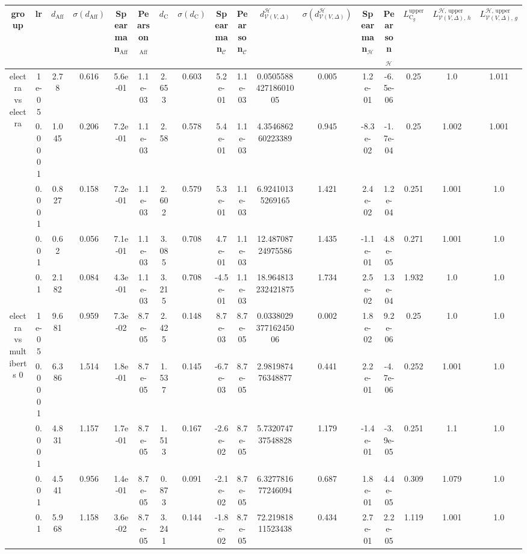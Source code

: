 \begin{tabular}{|c|c|c|c|c|c|c|c|c|c|c|c|c|c|c|c|c|}
\hline
group & lr & $d_{\mathrm{Aff}}$ & $\sigma(d_{\mathrm{Aff}})$ & Spearman$_{\mathrm{Aff}}$ & Pearson$_{\mathrm{Aff}}$ & $d_{\mathrm{C}}$ & $\sigma(d_{\mathrm{C}})$ & Spearman$_{\mathcal{C}}$ & Pearson$_{\mathcal{C}}$ & $d^\mathcal{H}_{\mathcal{V}(V,\Delta)}$ & $\sigma(d^\mathcal{H}_{\mathcal{V}(V,\Delta)})$ & Spearman$_{\mathcal{H}}$ & Pearson$_{\mathcal{H}}$ & $L_{\mathrm{C}_g}^{\mathrm{upper}}$ & $L^{\mathcal{H},\,\mathrm{upper}}_{\mathcal{V}(V,\Delta),\,h}$ & $L^{\mathcal{H},\,\mathrm{upper}}_{\mathcal{V}(V,\Delta),\,g}$ \\
\hline
\multirow{5}{*}{electra  vs electra } & 1e-05 & 2.78 & 0.616 & 5.6e-01 & 1.1e-03 & 2.653 & 0.603 & 5.2e-01 & 1.1e-03 & 0.050558842718601005 & 0.005 & 1.2e-01 & -6.5e-06 & 0.25 & 1.0 & 1.011 \\
 & 0.0001 & 1.045 & 0.206 & 7.2e-01 & 1.1e-03 & 2.58 & 0.578 & 5.4e-01 & 1.1e-03 & 4.354686260223389 & 0.945 & -8.3e-02 & -1.7e-04 & 0.25 & 1.002 & 1.001 \\
 & 0.001 & 0.827 & 0.158 & 7.2e-01 & 1.1e-03 & 2.602 & 0.579 & 5.3e-01 & 1.1e-03 & 6.92410135269165 & 1.421 & 2.4e-02 & 1.2e-04 & 0.251 & 1.001 & 1.0 \\
 & 0.01 & 0.62 & 0.056 & 7.1e-01 & 1.1e-03 & 3.085 & 0.708 & 4.7e-01 & 1.1e-03 & 12.48708724975586 & 1.435 & -1.1e-01 & 4.8e-05 & 0.271 & 1.001 & 1.0 \\
 & 0.1 & 2.182 & 0.084 & 4.3e-01 & 1.1e-03 & 3.215 & 0.708 & -4.5e-01 & 1.1e-03 & 18.964813232421875 & 1.734 & 2.5e-02 & 1.3e-04 & 1.932 & 1.0 & 1.0 \\
\hline
\multirow{5}{*}{electra  vs multiberts 0} & 1e-05 & 9.681 & 0.959 & 7.3e-02 & 8.7e-05 & 2.425 & 0.148 & 8.7e-03 & 8.7e-05 & 0.033802937716245006 & 0.002 & 1.8e-02 & 9.2e-06 & 0.25 & 1.0 & 1.0 \\
 & 0.0001 & 6.386 & 1.514 & 1.8e-01 & 8.7e-05 & 1.537 & 0.145 & -6.7e-03 & 8.7e-05 & 2.981987476348877 & 0.441 & 2.2e-01 & -4.7e-06 & 0.252 & 1.001 & 1.0 \\
 & 0.001 & 4.831 & 1.157 & 1.7e-01 & 8.7e-05 & 1.513 & 0.167 & -2.6e-02 & 8.7e-05 & 5.732074737548828 & 1.179 & -1.4e-01 & -3.9e-05 & 0.251 & 1.1 & 1.0 \\
 & 0.01 & 4.541 & 0.956 & 1.4e-01 & 8.7e-05 & 0.873 & 0.091 & -2.1e-02 & 8.7e-05 & 6.327781677246094 & 0.687 & 1.8e-01 & 4.4e-05 & 0.309 & 1.079 & 1.0 \\
 & 0.1 & 5.968 & 1.158 & 3.6e-02 & 8.7e-05 & 3.241 & 0.144 & -1.8e-02 & 8.7e-05 & 72.21981811523438 & 0.434 & 2.7e-01 & 2.2e-05 & 1.119 & 1.001 & 1.0 \\

\end{tabular}
